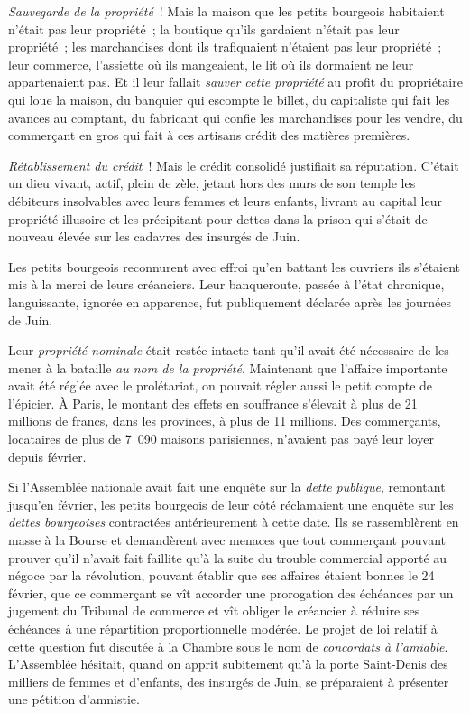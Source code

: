 \documentclass[french,twoside]{book} %
\begin{document}
\emph{Sauvegarde de la propriété} ! Mais la maison que les petits bourgeois habitaient n’était pas leur propriété ; la boutique qu’ils gardaient n’était pas leur propriété ; les marchandises dont ils trafiquaient n’étaient pas leur propriété ; leur commerce, l’assiette où ils mangeaient, le lit où ils dormaient ne leur appartenaient pas. Et il leur fallait \emph{sauver cette propriété} au profit du propriétaire qui loue la maison, du banquier qui escompte le billet, du capitaliste qui fait les avances au comptant, du fabricant qui confie les marchandises pour les vendre, du commerçant en gros qui fait à ces artisans crédit des matières premières.\par
\emph{Rétablissement du crédit} ! Mais le crédit consolidé justifiait sa réputation. C’était un dieu vivant, actif, plein de zèle, jetant hors des murs de son temple les débiteurs insolvables avec leurs femmes et leurs enfants, livrant au capital leur propriété illusoire et les précipitant pour dettes dans la prison qui s’était de nouveau élevée sur les cadavres des insurgés de Juin.\par
Les petits bourgeois reconnurent avec effroi qu’en battant les ouvriers ils s’étaient mis à la merci de leurs créanciers. Leur banqueroute, passée à l’état chronique, languissante, ignorée en apparence, fut publiquement déclarée après les journées de Juin.\par
Leur \emph{propriété nominale} était restée intacte tant qu’il avait été nécessaire de les mener à la bataille \emph{au nom de la propriété}. Maintenant que l’affaire importante avait été réglée avec le prolétariat, on pouvait régler aussi le petit compte de l’épicier. À Paris, le montant des effets en souffrance s’élevait à plus de 21 millions de francs, dans les provinces, à plus de 11 millions. Des commerçants, locataires de plus de 7 090 maisons parisiennes, n’avaient pas payé leur loyer depuis février.\par
Si l’Assemblée nationale avait fait une enquête sur la \emph{dette publique}, remontant jusqu’en février, les petits bourgeois de leur côté réclamaient une enquête sur les \emph{dettes bourgeoises} contractées antérieurement à cette date. Ils se rassemblèrent en masse à la Bourse et demandèrent avec menaces que tout commerçant pouvant prouver qu’il n’avait fait faillite qu’à la suite du trouble commercial apporté au négoce par la révolution, pouvant établir que ses affaires étaient bonnes le 24 février, que ce commerçant se vît accorder une prorogation des échéances par un jugement du Tribunal de commerce et vît obliger le créancier à réduire ses échéances à une répartition proportionnelle modérée. Le projet de loi relatif à cette question fut discutée à la Chambre sous le nom de \emph{concordats à l’amiable}. L’Assemblée hésitait, quand on apprit subitement qu’à la porte Saint-Denis des milliers de femmes et d’enfants, des insurgés de Juin, se préparaient à présenter une pétition d’amnistie.\par
\end{document}
